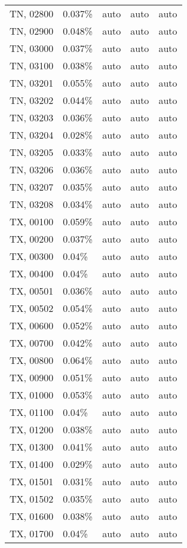 \begin{longtable}[]{@{}lllll@{}}
TN, 02800 & 0.037\% & auto & auto & auto \\
TN, 02900 & 0.048\% & auto & auto & auto \\
TN, 03000 & 0.037\% & auto & auto & auto \\
TN, 03100 & 0.038\% & auto & auto & auto \\
TN, 03201 & 0.055\% & auto & auto & auto \\
TN, 03202 & 0.044\% & auto & auto & auto \\
TN, 03203 & 0.036\% & auto & auto & auto \\
TN, 03204 & 0.028\% & auto & auto & auto \\
TN, 03205 & 0.033\% & auto & auto & auto \\
TN, 03206 & 0.036\% & auto & auto & auto \\
TN, 03207 & 0.035\% & auto & auto & auto \\
TN, 03208 & 0.034\% & auto & auto & auto \\
TX, 00100 & 0.059\% & auto & auto & auto \\
TX, 00200 & 0.037\% & auto & auto & auto \\
TX, 00300 & 0.04\% & auto & auto & auto \\
TX, 00400 & 0.04\% & auto & auto & auto \\
TX, 00501 & 0.036\% & auto & auto & auto \\
TX, 00502 & 0.054\% & auto & auto & auto \\
TX, 00600 & 0.052\% & auto & auto & auto \\
TX, 00700 & 0.042\% & auto & auto & auto \\
TX, 00800 & 0.064\% & auto & auto & auto \\
TX, 00900 & 0.051\% & auto & auto & auto \\
TX, 01000 & 0.053\% & auto & auto & auto \\
TX, 01100 & 0.04\% & auto & auto & auto \\
TX, 01200 & 0.038\% & auto & auto & auto \\
TX, 01300 & 0.041\% & auto & auto & auto \\
TX, 01400 & 0.029\% & auto & auto & auto \\
TX, 01501 & 0.031\% & auto & auto & auto \\
TX, 01502 & 0.035\% & auto & auto & auto \\
TX, 01600 & 0.038\% & auto & auto & auto \\
TX, 01700 & 0.04\% & auto & auto & auto \\

\end{longtable}

